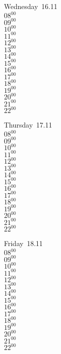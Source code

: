 \documentclass[11pt,a4paper]{book}\usepackage[]{graphicx}\usepackage[]{color}
\begin{document}
\begin{weekdaybox}
  Wednesday~16.11\\
  { 
  \vfill
  $08^{00}$\\
$09^{00}$\\
$10^{00}$\\
$11^{00}$\\
$12^{00}$\\
$13^{00}$\\
$14^{00}$\\
$15^{00}$\\
$16^{00}$\\
$17^{00}$\\
$18^{00}$\\
$19^{00}$\\
$20^{00}$\\
$21^{00}$\\
$22^{00}$\\
  }
\end{weekdaybox}
\clearpage
\begin{headerbox}
\end{headerbox}
\begin{weekdaybox}
  Thursday~17.11\\
  { 
  \vfill
  $08^{00}$\\
$09^{00}$\\
$10^{00}$\\
$11^{00}$\\
$12^{00}$\\
$13^{00}$\\
$14^{00}$\\
$15^{00}$\\
$16^{00}$\\
$17^{00}$\\
$18^{00}$\\
$19^{00}$\\
$20^{00}$\\
$21^{00}$\\
$22^{00}$\\
  }
\end{weekdaybox} 
\begin{weekdaybox}
  Friday~18.11\\
  { 
  \vfill
  $08^{00}$\\
$09^{00}$\\
$10^{00}$\\
$11^{00}$\\
$12^{00}$\\
$13^{00}$\\
$14^{00}$\\
$15^{00}$\\
$16^{00}$\\
$17^{00}$\\
$18^{00}$\\
$19^{00}$\\
$20^{00}$\\
$21^{00}$\\
$22^{00}$\\
  }
\end{weekdaybox}
\end{document}
